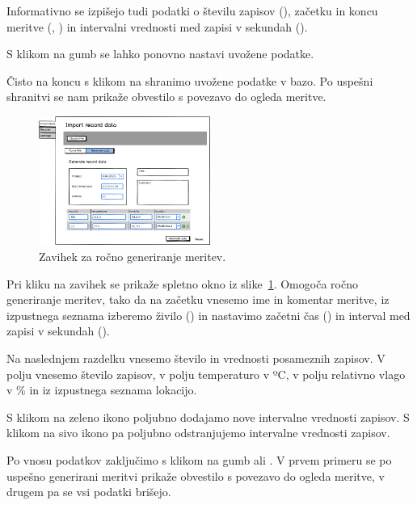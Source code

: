 \documentclass[a4paper, 12pt]{book}
\begin{document}
Informativno se izpišejo tudi podatki o številu zapisov (), začetku in koncu meritve (, ) in intervalni vrednosti med zapisi v sekundah (). 

S klikom na gumb  se lahko ponovno nastavi uvožene podatke.

Čisto na koncu s klikom na  shranimo uvožene podatke v bazo. Po uspešni shranitvi se nam prikaže obvestilo s povezavo do ogleda meritve.

\begin{figure}[h]
\begin{center}
\includegraphics[width=0.5\textwidth]{slike/Import-data-Generate.png}
\end{center}
\caption{Zavihek  za ročno generiranje meritev.}
\label{generate-data-wireframe}
\end{figure}

Pri kliku na zavihek  se prikaže spletno okno iz slike~\ref{generate-data-wireframe}. Omogoča ročno generiranje meritev, tako da na začetku vnesemo ime in komentar meritve, iz izpustnega seznama izberemo živilo () in nastavimo začetni čas () in interval med zapisi v sekundah ().

Na naslednjem razdelku vnesemo število in vrednosti posameznih zapisov. V polju  vnesemo število zapisov, v polju  temperaturo v ºC, v polju  relativno vlago v \% in iz izpustnega seznama  lokacijo.

S klikom na zeleno ikono  poljubno dodajamo nove intervalne vrednosti zapisov. 
S klikom na sivo ikono  pa poljubno odstranjujemo intervalne vrednosti zapisov.

Po vnosu podatkov zaključimo s klikom na gumb  ali . V prvem primeru se po uspešno generirani meritvi prikaže obvestilo s povezavo do ogleda meritve, v drugem pa se vsi podatki brišejo.
\end{document}
